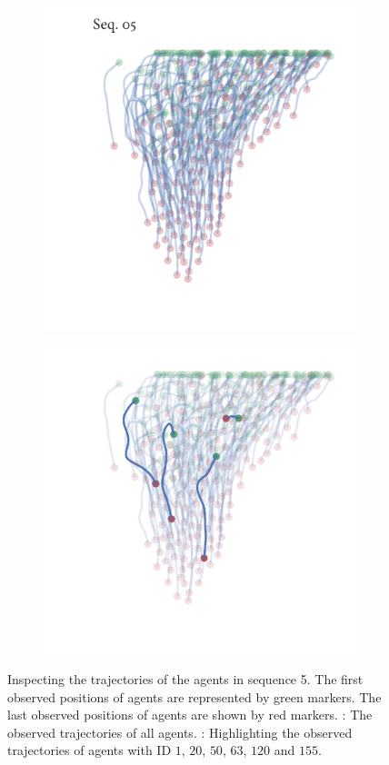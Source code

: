 \begin{figure}[!tbp]
	\begin{subfigure}[b]{0.5\textwidth}
		\centering
		\includegraphics{sequence05.pdf}
		\caption{}
		\label{subfig:seq05_traj_no_highlight}
	\end{subfigure}%
	\begin{subfigure}[b]{0.5\textwidth}
		\centering
		\includegraphics{sequence05_highlight.pdf}
		\caption{}
		\label{subfig:seq05_traj_highlight}
	\end{subfigure}
	\caption{Inspecting the trajectories of the agents in sequence 5. The first observed positions of agents are represented by green markers. The last observed positions of agents are shown by red markers. : The observed trajectories of all agents. : Highlighting the observed trajectories of agents with ID $1$, $20$, $50$, $63$, $120$ and $155$.}
	\label{fig:seq05_traj}
\end{figure}


